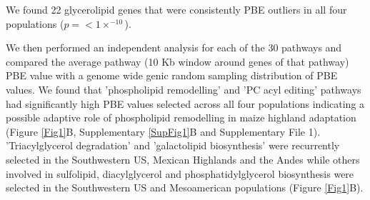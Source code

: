 \documentclass[9pt,twocolumn,twoside,lineno]{BioRxiv}
\begin{document}
We found 22 glycerolipid genes that were consistently PBE outliers in all four populations ($p =<1  \times  ^{-10}$). 

We then performed an independent analysis for each of the 30 pathways and compared the average pathway (10 Kb window around genes of that pathway) PBE value with a genome wide genic random sampling distribution of PBE values. 
We found that 'phospholipid remodelling'  and 'PC acyl editing'  pathways had significantly high PBE values selected across all four populations indicating a possible adaptive role of phospholipid remodelling in maize highland adaptation (Figure \ref{Fig1}B, Supplementary \ref{SupFig1}B and Supplementary File 1). 
'Triacylglycerol degradation' and 'galactolipid biosynthesis' were recurrently selected in the Southwestern US, Mexican Highlands and the Andes while others involved in sulfolipid, diacylglycerol and phosphatidylglycerol biosynthesis were selected in the Southwestern US and Mesoamerican populations (Figure \ref{Fig1}B).  %
\end{document}
